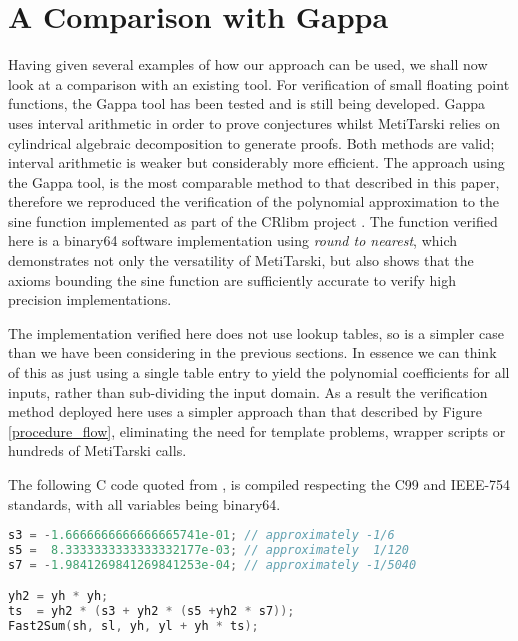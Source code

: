 \documentclass{fac}
\begin{document}
\section{A Comparison with Gappa}
\label{gappa}

Having given several examples of how our approach can be used, we shall now look at a comparison with an existing tool. For verification of small floating point functions, the Gappa tool \cite{de2006assisted,boldo2009combining} has been tested and is still being developed. Gappa uses interval arithmetic in order to prove conjectures whilst MetiTarski relies on cylindrical algebraic decomposition to generate proofs. Both methods are valid; interval arithmetic is weaker but considerably more efficient. The approach using the Gappa tool, is the most comparable method to that described in this paper, therefore we reproduced the verification of the polynomial approximation to the sine function implemented as part of the CRlibm project \cite{daramy2009cr,5483294}. The function verified here is a binary64 software implementation using \textit{round to nearest}, which demonstrates not only the versatility of MetiTarski, but also shows that the axioms bounding the sine function are sufficiently accurate to verify high precision implementations.

The implementation verified here does not use lookup tables, so is a simpler case than we have been considering in the previous sections. In essence we can think of this as just using a single table entry to yield the polynomial coefficients for all inputs, rather than sub-dividing the input domain. As a result the verification method deployed here uses a simpler approach than that described by Figure \ref{procedure_flow}, eliminating the need for template problems, wrapper scripts or hundreds of MetiTarski calls. 

The following C code quoted from \cite{5483294}, is compiled respecting the C99 and IEEE-754 standards, with all variables being binary64. 

\begin{lstlisting}[language=C]
s3 = -1.6666666666666665741e-01; // approximately -1/6
s5 =  8.3333333333333332177e-03; // approximately  1/120
s7 = -1.9841269841269841253e-04; // approximately -1/5040

yh2 = yh * yh;
ts  = yh2 * (s3 + yh2 * (s5 +yh2 * s7));
Fast2Sum(sh, sl, yh, yl + yh * ts);
\end{lstlisting}
\end{document}
